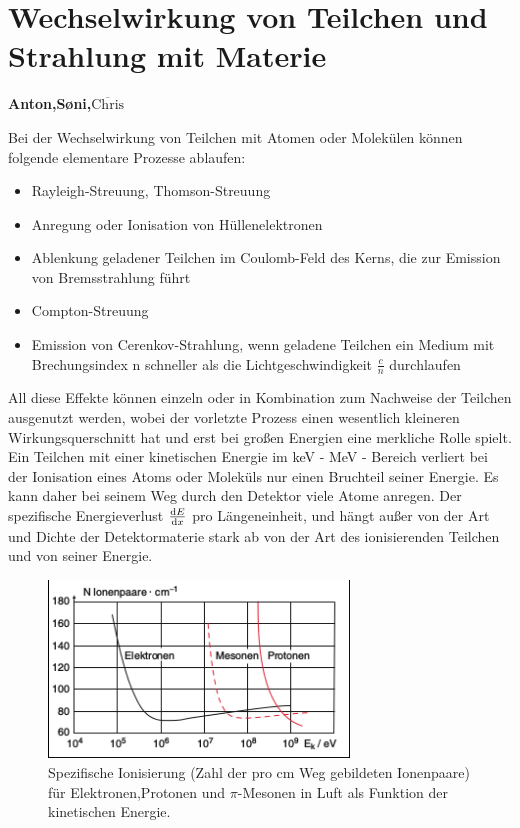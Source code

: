 \documentclass[Ex4_Zusammenfassung.tex]{subfiles}
\begin{document}
\chapter{Wechselwirkung von Teilchen und Strahlung mit Materie}
\textbf{Anton,S\o{}ni,$\overline{\text{Chris}}$}


Bei der Wechselwirkung von Teilchen mit Atomen oder Molekülen können folgende elementare Prozesse ablaufen:
\begin{itemize}
\item Rayleigh-Streuung, Thomson-Streuung
\item Anregung oder Ionisation von Hüllenelektronen
\item Ablenkung geladener Teilchen im Coulomb-Feld des Kerns, die zur Emission von Bremsstrahlung führt
\item Compton-Streuung
\item Emission von Cerenkov-Strahlung, wenn geladene Teilchen ein Medium mit Brechungsindex n schneller als die Lichtgeschwindigkeit $\frac{c}{n}$ durchlaufen
\end{itemize}
All diese Effekte können einzeln oder in Kombination zum Nachweise der Teilchen ausgenutzt werden, wobei der vorletzte Prozess einen wesentlich kleineren Wirkungsquerschnitt hat und erst bei großen Energien eine merkliche Rolle spielt.
Ein Teilchen mit einer kinetischen Energie im keV - MeV - Bereich verliert bei der Ionisation eines Atoms oder Moleküls nur einen Bruchteil seiner Energie. Es kann daher bei seinem Weg durch den Detektor viele Atome anregen. Der spezifische Energieverlust $\frac{\mathrm{d} E}{\mathrm{d} x}$ pro Längeneinheit, und hängt außer von der Art und Dichte der Detektormaterie stark ab von der Art des ionisierenden Teilchen und von seiner Energie.


\begin{figure}[H]
	\centering
	\includegraphics[width=8cm]{Ionisationsplot.png}
	\caption{Spezifische Ionisierung (Zahl der pro cm Weg gebildeten Ionenpaare) für Elektronen,Protonen und $\pi$-Mesonen in Luft als Funktion der kinetischen Energie.}
\end{figure}
\end{document}
